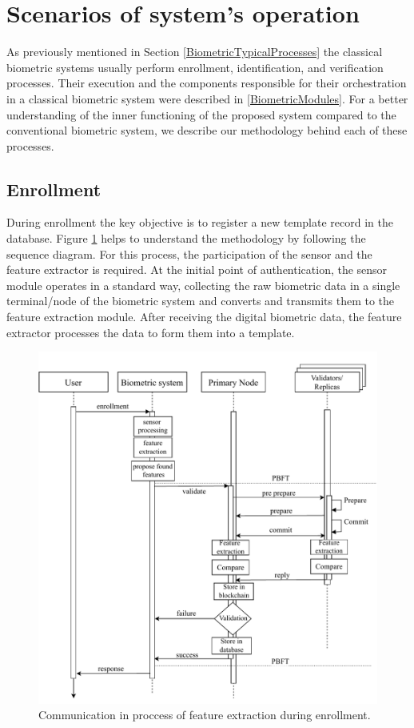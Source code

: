\section{Scenarios of system's operation}
As previously mentioned in Section \ref{BiometricTypicalProcesses} the classical biometric systems usually perform enrollment, identification, and verification processes.
Their execution and the components responsible for their orchestration in a classical biometric system were described in \ref{BiometricModules}. For a better understanding of the inner functioning of the proposed system compared to the conventional biometric system, we describe our methodology behind each of these processes. 

\subsection{Enrollment}
During enrollment the key objective is to register a new template record in the database. Figure \ref{PBFTSequenceDiagram} helps to understand the methodology by following the sequence diagram. For this process, the participation of the sensor and the feature extractor is required. At the initial point of authentication, the sensor module operates in a standard way, collecting the raw biometric data in a single terminal/node of the biometric system and converts and transmits them to the feature extraction module. After receiving the digital biometric data, the feature extractor processes the data to form them into a template.
\begin{figure}[h!]
	\centering
	\includegraphics[width=\linewidth]{obrazky-figures/SequenceDiagramFeatureExtract.pdf}
	\caption{Communication in proccess of feature extraction during enrollment.}
	\label{PBFTSequenceDiagram}
\end{figure}

